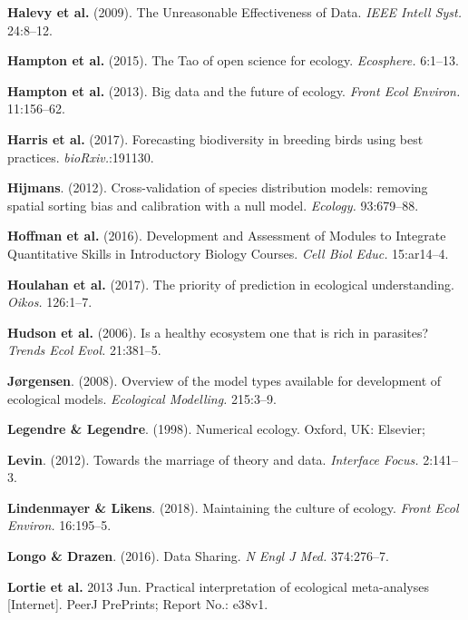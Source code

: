 \documentclass[12pt]{article}
\begin{document}
\leavevmode\hypertarget{ref-HaleNorv09}{}%
\textbf{Halevy et al.} (2009). The Unreasonable Effectiveness of Data.
\emph{IEEE Intell Syst.} 24:8--12.

\leavevmode\hypertarget{ref-HampAnde15}{}%
\textbf{Hampton et al.} (2015). The Tao of open science for ecology.
\emph{Ecosphere.} 6:1--13.

\leavevmode\hypertarget{ref-HampStra13}{}%
\textbf{Hampton et al.} (2013). Big data and the future of ecology.
\emph{Front Ecol Environ.} 11:156--62.

\leavevmode\hypertarget{ref-HarrTayl17}{}%
\textbf{Harris et al.} (2017). Forecasting biodiversity in breeding
birds using best practices. \emph{bioRxiv.}:191130.

\leavevmode\hypertarget{ref-Hijm12}{}%
\textbf{Hijmans}. (2012). Cross-validation of species distribution
models: removing spatial sorting bias and calibration with a null model.
\emph{Ecology.} 93:679--88.

\leavevmode\hypertarget{ref-HoffLeup16}{}%
\textbf{Hoffman et al.} (2016). Development and Assessment of Modules to
Integrate Quantitative Skills in Introductory Biology Courses.
\emph{Cell Biol Educ.} 15:ar14--4.

\leavevmode\hypertarget{ref-HoulMcKi17}{}%
\textbf{Houlahan et al.} (2017). The priority of prediction in
ecological understanding. \emph{Oikos.} 126:1--7.

\leavevmode\hypertarget{ref-HudsDobs06}{}%
\textbf{Hudson et al.} (2006). Is a healthy ecosystem one that is rich
in parasites? \emph{Trends Ecol Evol.} 21:381--5.

\leavevmode\hypertarget{ref-Jorg08}{}%
\textbf{Jørgensen}. (2008). Overview of the model types available for
development of ecological models. \emph{Ecological Modelling.} 215:3--9.

\leavevmode\hypertarget{ref-LegeLege98}{}%
\textbf{Legendre \& Legendre}. (1998). Numerical ecology. Oxford, UK:
Elsevier;

\leavevmode\hypertarget{ref-Levi12}{}%
\textbf{Levin}. (2012). Towards the marriage of theory and data.
\emph{Interface Focus.} 2:141--3.

\leavevmode\hypertarget{ref-LindLike18}{}%
\textbf{Lindenmayer \& Likens}. (2018). Maintaining the culture of
ecology. \emph{Front Ecol Environ.} 16:195--5.

\leavevmode\hypertarget{ref-LongDraz16}{}%
\textbf{Longo \& Drazen}. (2016). Data Sharing. \emph{N Engl J Med.}
374:276--7.

\leavevmode\hypertarget{ref-LortStew13}{}%
\textbf{Lortie et al.} 2013 Jun. Practical interpretation of ecological
meta-analyses {[}Internet{]}. PeerJ PrePrints; Report No.: e38v1.
\end{document}
